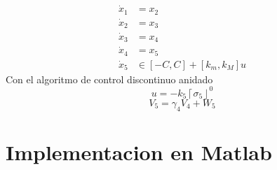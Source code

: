   \begin{equation}
      \begin{split}
        \dot{x}_1&=x_2 \\
        \dot{x}_2&=x_3 \\
        \dot{x}_3&=x_4 \\
        \dot{x}_4&=x_5 \\
      \dot{x}_5& \in [-C,C]+ [k_m, k_M] u
      \end{split}
      \label{inclusion2}
  \end{equation}
  Con el algoritmo de control discontinuo anidado
  \begin{equation}
    u=-k_5 \left\lceil \sigma_5 \right\rfloor^0
  \end{equation}
  \begin{equation}
    V_5=\gamma_4 V_4+W_5
  \end{equation}  
  
\section{Implementacion en Matlab}



	
